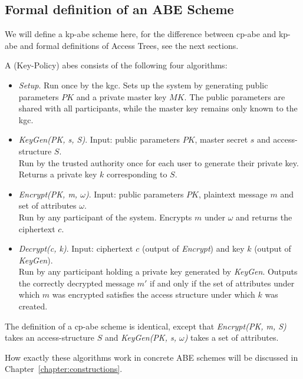\subsection{Formal definition of an ABE Scheme}\label{sec:definition-es}

We will define a \acrshort{kp-abe} scheme here, for the difference between \acrshort{cp-abe} and \acrshort{kp-abe} and formal definitions of Access Trees, see the next sections.

\begin{definition}
    A (Key-Policy) \Acrlong{abes} consists of the following four algorithms:~\cite{goyal_attribute-based_2006}
    \begin{itemize}
        \item \emph{Setup}. Run once by the \acrfull{kgc}. Sets up the system by generating public parameters $PK$ and a private master key $MK$. The public parameters are shared with all participants, while the master key remains only known to the \acrshort{kgc}.
        \item \emph{KeyGen(PK, s, S)}. Input: public parameters $PK$, master secret $s$ and \gls{access-structure} $S$.\\
        Run by the trusted authority once for each user to generate their private key. Returns a private key $k$ corresponding to $S$.
        \item \emph{Encrypt(PK, m, $\omega$)}. Input: public parameters $PK$, plaintext message $m$ and set of attributes $\omega$.\\
        Run by any participant of the system. Encrypts $m$ under $\omega$ and returns the ciphertext $c$.
        \item \emph{Decrypt(c, k)}. Input: ciphertext $c$ (output of \emph{Encrypt}) and key $k$ (output of \emph{KeyGen}).\\
        Run by any participant holding a private key generated by \emph{KeyGen}. Outputs the correctly decrypted message $m'$ if and only if the set of attributes under which $m$ was encrypted satisfies the access structure under which $k$ was created.
    \end{itemize}
\end{definition}

The definition of a \acrshort{cp-abe} scheme is identical, except that \emph{Encrypt(PK, m, S)} takes an \gls{access-structure} $S$ and \emph{KeyGen(PK, s, $\omega$)} takes a set of attributes.

How exactly these algorithms work in concrete ABE schemes will be discussed in Chapter~\ref{chapter:constructions}.

